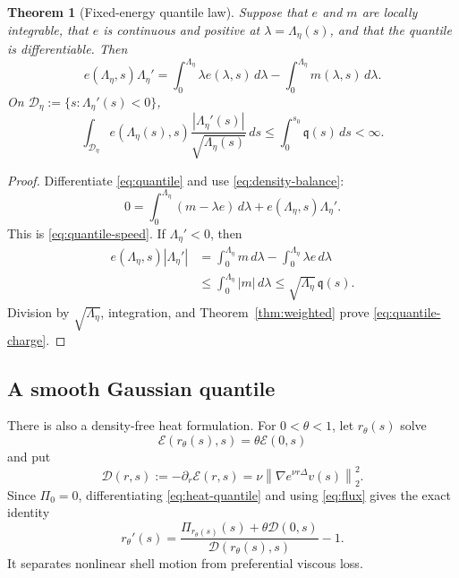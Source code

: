 \documentclass[11pt]{article}
\newtheorem{theorem}{Theorem}
\theoremstyle{remark}
\newcommand{\norm}[1]{\left\|#1\right\|}
\begin{document}
\begin{theorem}[Fixed-energy quantile law]
\label{thm:quantile}
Suppose that \(e\) and \(m\) are locally integrable, that \(e\) is
continuous and positive at \(\lambda=\Lambda_\eta(s)\), and that the
quantile is differentiable.  Then
\begin{equation}
\label{eq:quantile-speed}
 e(\Lambda_\eta,s)\Lambda_\eta'
 =
 \int_0^{\Lambda_\eta}\lambda e(\lambda,s)\,d\lambda
 -
 \int_0^{\Lambda_\eta}m(\lambda,s)\,d\lambda.
\end{equation}
On
\(\mathcal D_\eta:=\{s:\Lambda_\eta'(s)<0\}\),
\begin{equation}
\label{eq:quantile-charge}
 \int_{\mathcal D_\eta}
 e(\Lambda_\eta(s),s)
 \frac{|\Lambda_\eta'(s)|}{\sqrt{\Lambda_\eta(s)}}\,ds
 \le
 \int_0^{s_0}\mathfrak q(s)\,ds<\infty.
\end{equation}
\end{theorem}

\begin{proof}
Differentiate \eqref{eq:quantile} and use
\eqref{eq:density-balance}:
\[
 0=
 \int_0^{\Lambda_\eta}(m-\lambda e)\,d\lambda
 +e(\Lambda_\eta,s)\Lambda_\eta'.
\]
This is \eqref{eq:quantile-speed}.  If
\(\Lambda_\eta'<0\), then
\begin{align*}
 e(\Lambda_\eta,s)|\Lambda_\eta'|
 &=
 \int_0^{\Lambda_\eta}m\,d\lambda
 -\int_0^{\Lambda_\eta}\lambda e\,d\lambda\\
 &\le
 \int_0^{\Lambda_\eta}|m|\,d\lambda
 \le
 \sqrt{\Lambda_\eta}\,\mathfrak q(s).
\end{align*}
Division by \(\sqrt{\Lambda_\eta}\), integration, and
Theorem~\ref{thm:weighted} prove \eqref{eq:quantile-charge}.
\end{proof}

\subsection*{A smooth Gaussian quantile}

There is also a density-free heat formulation.  For \(0<\theta<1\),
let \(r_\theta(s)\) solve
\begin{equation}
\label{eq:heat-quantile}
 \mathcal E(r_\theta(s),s)=\theta\mathcal E(0,s)
\end{equation}
and put
\begin{equation}
\label{eq:D}
 \mathcal D(r,s):=-\partial_r\mathcal E(r,s)
 =\nu\norm{\nabla e^{\nu r\Delta}v(s)}_2^2.
\end{equation}
Since \(\Pi_0=0\), differentiating \eqref{eq:heat-quantile} and using
\eqref{eq:flux} gives the exact identity
\begin{equation}
\label{eq:heat-speed}
 \boxed{
 r_\theta'(s)
 =
 \frac{\Pi_{r_\theta(s)}(s)+\theta\mathcal D(0,s)}
 {\mathcal D(r_\theta(s),s)}
 -1.}
\end{equation}
It separates nonlinear shell motion from preferential viscous loss.
\end{document}
